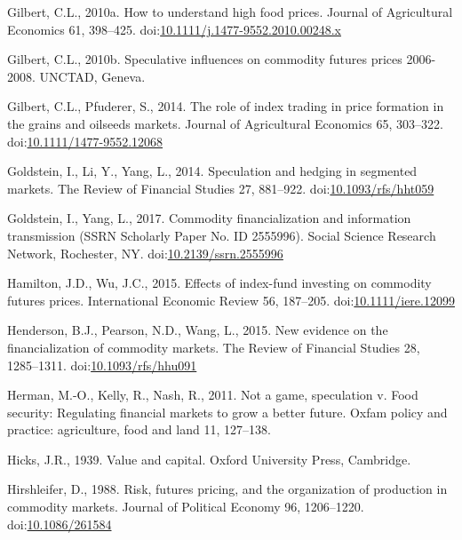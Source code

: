 \documentclass[]{elsarticle} %
\begin{document}
\leavevmode\hypertarget{ref-gilbert_how_2010}{}%
Gilbert, C.L., 2010a. How to understand high food prices. Journal of
Agricultural Economics 61, 398--425.
doi:\href{https://doi.org/10.1111/j.1477-9552.2010.00248.x}{10.1111/j.1477-9552.2010.00248.x}

\leavevmode\hypertarget{ref-gilbert_speculative_2010}{}%
Gilbert, C.L., 2010b. Speculative influences on commodity futures prices
2006-2008. UNCTAD, Geneva.

\leavevmode\hypertarget{ref-gilbert_role_2014}{}%
Gilbert, C.L., Pfuderer, S., 2014. The role of index trading in price
formation in the grains and oilseeds markets. Journal of Agricultural
Economics 65, 303--322.
doi:\href{https://doi.org/10.1111/1477-9552.12068}{10.1111/1477-9552.12068}

\leavevmode\hypertarget{ref-goldstein_speculation_2014}{}%
Goldstein, I., Li, Y., Yang, L., 2014. Speculation and hedging in
segmented markets. The Review of Financial Studies 27, 881--922.
doi:\href{https://doi.org/10.1093/rfs/hht059}{10.1093/rfs/hht059}

\leavevmode\hypertarget{ref-goldstein_commodity_2017}{}%
Goldstein, I., Yang, L., 2017. Commodity financialization and
information transmission (SSRN Scholarly Paper No. ID 2555996). Social
Science Research Network, Rochester, NY.
doi:\href{https://doi.org/10.2139/ssrn.2555996}{10.2139/ssrn.2555996}

\leavevmode\hypertarget{ref-hamilton_effects_2015}{}%
Hamilton, J.D., Wu, J.C., 2015. Effects of index-fund investing on
commodity futures prices. International Economic Review 56, 187--205.
doi:\href{https://doi.org/10.1111/iere.12099}{10.1111/iere.12099}

\leavevmode\hypertarget{ref-henderson_new_2015}{}%
Henderson, B.J., Pearson, N.D., Wang, L., 2015. New evidence on the
financialization of commodity markets. The Review of Financial Studies
28, 1285--1311.
doi:\href{https://doi.org/10.1093/rfs/hhu091}{10.1093/rfs/hhu091}

\leavevmode\hypertarget{ref-herman_not_2011}{}%
Herman, M.-O., Kelly, R., Nash, R., 2011. Not a game, speculation v.
Food security: Regulating financial markets to grow a better future.
Oxfam policy and practice: agriculture, food and land 11, 127--138.

\leavevmode\hypertarget{ref-hicks_value_1939}{}%
Hicks, J.R., 1939. Value and capital. Oxford University Press,
Cambridge.

\leavevmode\hypertarget{ref-hirshleifer_risk_1988}{}%
Hirshleifer, D., 1988. Risk, futures pricing, and the organization of
production in commodity markets. Journal of Political Economy 96,
1206--1220. doi:\href{https://doi.org/10.1086/261584}{10.1086/261584}
\end{document}
